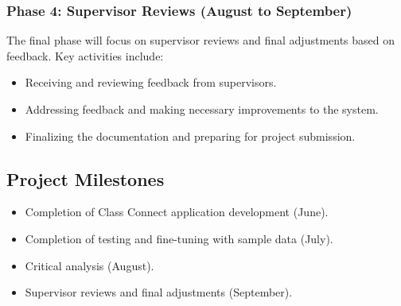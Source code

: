 \documentclass[a4paper,10pt]{article}
\begin{document}
\subsubsection{Phase 4: Supervisor Reviews (August to September)}
The final phase will focus on supervisor reviews and final adjustments based on feedback. Key activities include:
\begin{itemize}
    \item Receiving and reviewing feedback from supervisors.
    \item Addressing feedback and making necessary improvements to the system.
    \item Finalizing the documentation and preparing for project submission.
\end{itemize}

\subsection{Project Milestones}
\begin{itemize}
    \item Completion of Class Connect application development (June).
    \item Completion of testing and fine-tuning with sample data (July).
    \item Critical analysis (August).
    \item Supervisor reviews and final adjustments (September).
\end{itemize}
\end{document}
